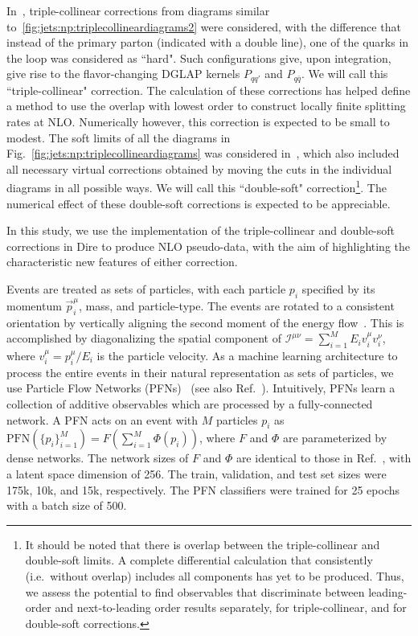 In~\cite{Hoche:2017iem}, triple-collinear corrections from diagrams
similar to~\ref{fig:jets:np:triplecollineardiagrams2} were considered, with
the difference that instead of the primary parton (indicated with a double 
line), one of the quarks in the loop was considered as ``hard". Such
configurations give, upon integration, give rise to the flavor-changing 
DGLAP kernels $P_{qq'}$ and $P_{q\bar q}$. We will call this 
``triple-collinear" correction. The calculation of these corrections has
helped define a method to use the overlap with lowest order to construct 
locally finite splitting rates at NLO. Numerically however, this correction is 
expected to be small to modest.
The soft limits of all the diagrams in Fig.~\ref{fig:jets:np:triplecollineardiagrams}
was considered in~\cite{Dulat:2018vuy}, which also included all necessary 
virtual corrections obtained by moving the cuts in the individual diagrams in 
all possible ways. We will call this ``double-soft" correction\footnote{
It should be noted that there is overlap between the
triple-collinear and double-soft limits. A complete differential calculation 
that consistently (i.e.\ without overlap) includes all components has yet
to be produced. Thus, we assess the potential to find observables
that discriminate between leading-order and next-to-leading order
results separately, for triple-collinear, and for double-soft corrections.}. 
The numerical effect of these double-soft corrections is expected to be appreciable.

In this study, we use the implementation of the triple-collinear and 
double-soft corrections in Dire to produce NLO pseudo-data, with the aim
of highlighting the characteristic new features of either correction.

Events are treated as sets of particles, with each particle $p_i$ specified by its momentum $\vec p_i^\mu$, mass, and particle-type.
%
The events are rotated to a consistent orientation by vertically aligning the second moment of the energy flow~\cite{Komiske:2019asc}.
%
This is accomplished by diagonalizing the spatial component of $\mathcal I^{\mu\nu} = \sum_{i=1}^M E_i v_i^\mu v_i^\nu$, where $v_i^\mu = p_i^\mu/E_i$ is the particle velocity.
As a machine learning architecture to process the entire events in their natural representation as sets of particles, we use Particle Flow Networks (PFNs)~\cite{Komiske:2018cqr} (see also Ref.~\cite{DBLP:conf/nips/ZaheerKRPSS17}).
%
Intuitively, PFNs learn a collection of additive observables which are processed by a fully-connected network.
%
A PFN acts on an event with $M$ particles $p_i$ as $\text{PFN}(\{p_i\}_{i=1}^M) = F\left(\sum_{i=1}^M \Phi(p_i)\right)$, where $F$ and $\Phi$ are parameterized by dense networks.
%
The network sizes of $F$ and $\Phi$ are identical to those in Ref.~\cite{Komiske:2018cqr}, with a latent space dimension of 256.
%
The train, validation, and test set sizes were 175k, 10k, and 15k, respectively.
%
The PFN classifiers were trained for 25 epochs with a batch size of 500.

